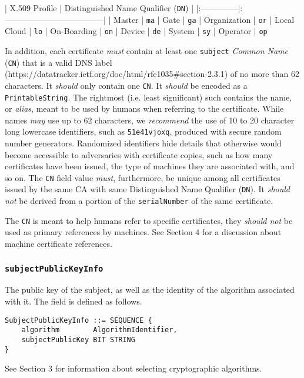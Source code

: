 | X.509 Profile | Distinguished Name Qualifier (\texttt{DN}) |
|:--------------|:------------------------------------|
| Master        | \texttt{ma}
| Gate          | \texttt{ga}
| Organization  | \texttt{or}
| Local Cloud   | \texttt{lo}
| On-Boarding   | \texttt{on}
| Device        | \texttt{de}
| System        | \texttt{sy}
| Operator      | \texttt{op}

In addition, each certificate \textit{must} contain at least one \texttt{subject} \textit{Common Name} (\texttt{CN}) that is a valid DNS label (https://datatracker.ietf.org/doc/html/rfc1035\#section-2.3.1) of no more than 62 characters.
It \textit{should} only contain one \texttt{CN}.
It \textit{should} be encoded as a \texttt{PrintableString}.
The rightmost (i.e. least significant) such contains the name, or \textit{alias}, meant to be used by humans when referring to the certificate.
While names \textit{may} use up to 62 characters, we \textit{recommend} the use of 10 to 20 character long lowercase identifiers, such as \texttt{51e41vjoxq}, produced with secure random number generators.
Randomized identifiers hide details that otherwise would become accessible to adversaries with certificate copies, such as how many certificates have been issued, the type of machines they are associated with, and so on.
The \texttt{CN} field value \textit{must}, furthermore, be unique among all certificates issued by the same CA with same Distinguished Name Qualifier (\texttt{DN}).
It \textit{should not} be derived from a portion of the \texttt{serialNumber} of the same certificate.

The \texttt{CN} is meant to help humans refer to specific certificates, they \textit{should not} be used as primary references by machines.
See Section 4 for a discussion about machine certificate references.

\subsubsection{\texttt{subjectPublicKeyInfo}}

The public key of the subject, as well as the identity of the algorithm associated with it.
The field is defined as follows.

\begin{verbatim}
SubjectPublicKeyInfo ::= SEQUENCE {
    algorithm        AlgorithmIdentifier,
    subjectPublicKey BIT STRING
}
\end{verbatim}

See Section 3 for information about selecting cryptographic algorithms.

